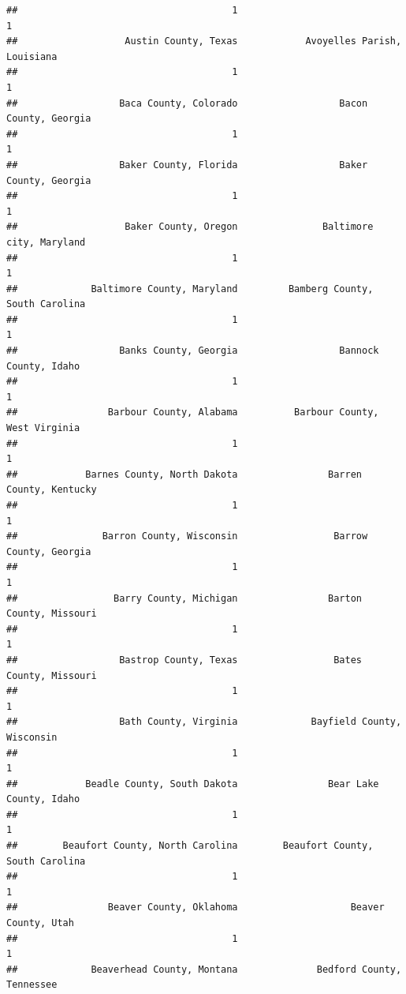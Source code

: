 \documentclass[
]{article}
\begin{document}
\begin{verbatim}
##                                      1                                      1 
##                   Austin County, Texas            Avoyelles Parish, Louisiana 
##                                      1                                      1 
##                  Baca County, Colorado                  Bacon County, Georgia 
##                                      1                                      1 
##                  Baker County, Florida                  Baker County, Georgia 
##                                      1                                      1 
##                   Baker County, Oregon               Baltimore city, Maryland 
##                                      1                                      1 
##             Baltimore County, Maryland         Bamberg County, South Carolina 
##                                      1                                      1 
##                  Banks County, Georgia                  Bannock County, Idaho 
##                                      1                                      1 
##                Barbour County, Alabama          Barbour County, West Virginia 
##                                      1                                      1 
##            Barnes County, North Dakota                Barren County, Kentucky 
##                                      1                                      1 
##               Barron County, Wisconsin                 Barrow County, Georgia 
##                                      1                                      1 
##                 Barry County, Michigan                Barton County, Missouri 
##                                      1                                      1 
##                  Bastrop County, Texas                 Bates County, Missouri 
##                                      1                                      1 
##                  Bath County, Virginia             Bayfield County, Wisconsin 
##                                      1                                      1 
##            Beadle County, South Dakota                Bear Lake County, Idaho 
##                                      1                                      1 
##        Beaufort County, North Carolina        Beaufort County, South Carolina 
##                                      1                                      1 
##                Beaver County, Oklahoma                    Beaver County, Utah 
##                                      1                                      1 
##             Beaverhead County, Montana              Bedford County, Tennessee 

\end{verbatim}
\end{document}
